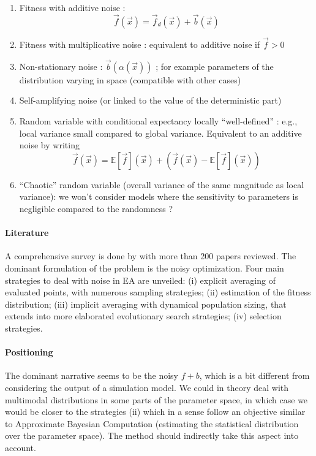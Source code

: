 \begin{enumerate}
\item Fitness with additive noise :
\[
\vec{f}(\vec{x}) = \vec{f}_d(\vec{x}) + \vec{b}(\vec{x})
\]
\item Fitness with multiplicative noise : equivalent to additive noise if $\vec{f} > 0$
\item Non-stationary noise : $\vec{b}(\alpha(\vec{x}))$ ; for example parameters of the distribution varying in space (compatible with other cases)
\item Self-amplifying noise (or linked to the value of the deterministic part)
\item Random variable with conditional expectancy locally ``well-defined'' : e.g., local variance small compared to global variance. Equivalent to an additive noise by writing
\[
\vec{f}(\vec{x}) = \mathbb{E}\left[\vec{f}\right](\vec{x}) + \left(\vec{f}(\vec{x}) - \mathbb{E}\left[\vec{f}\right](\vec{x})\right)
\]
\item ``Chaotic'' random variable (overall variance of the same magnitude as local variance): we won't consider models where the sensitivity to parameters is negligible compared to the randomness ?
\end{enumerate}

\paragraph{Literature}

A comprehensive survey is done by \cite{rakshit2017noisy} with more than 200 papers reviewed. The dominant formulation of the problem is the noisy optimization. Four main strategies to deal with noise in EA are unveiled: (i) explicit averaging of evaluated points, with numerous sampling strategies; (ii) estimation of the fitness distribution; (iii) implicit averaging with dynamical population sizing, that extends into more elaborated evolutionary search strategies; (iv) selection strategies.

\paragraph{Positioning}

The dominant narrative seems to be the noisy $f + b$, which is a bit different from considering the output of a simulation model. We could in theory deal with multimodal distributions in some parts of the parameter space, in which case we would be closer to the strategies (ii) which in a sense follow an objective similar to Approximate Bayesian Computation \cite{10.1371/journal.pcbi.1002803} (estimating the statistical distribution over the parameter space). The method should indirectly take this aspect into account.

